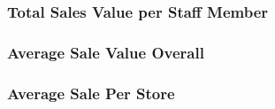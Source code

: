 \documentclass{article}
\begin{document}
            \subsubsection{Total Sales Value per Staff Member}



            \subsubsection{Average Sale Value Overall}
            \subsubsection{Average Sale Per Store}

\end{document}

